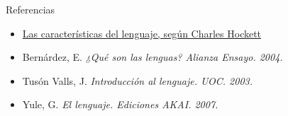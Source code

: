 \documentclass[handout]{beamer}
\begin{document}
	
\begin{frame}{Referencias}

	\begin{itemize}
		\item \href{http://es.wikipedia.org/wiki/Lengua\_natural\#Caracter.C3.ADsticas\_de\_las\_lenguas\_naturales}{Las características del lenguaje, según Charles Hockett}
		\item Bernárdez, E. \it{¿Qué son las lenguas?} Alianza Ensayo. 2004.
		\item Tusón Valls, J. \it{Introducción al lenguaje}. UOC. 2003.
		\item Yule, G. \it{El lenguaje}. Ediciones AKAI. 2007. 
	\end{itemize}

\end{frame}
\end{document}
